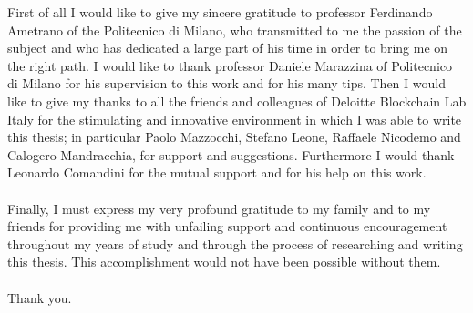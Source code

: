 \documentclass[
11pt, %
oneside, %
english, %
singlespacing, %
toctotoc, %
headsepline, %
]{MastersDoctoralThesis} %
\begin{document}
	\begin{acknowledgements}
		\addchaptertocentry{\acknowledgementname} %
		First of all I would like to give my sincere gratitude to professor Ferdinando Ametrano of the Politecnico di Milano, who transmitted to me the passion of the subject and who has dedicated a large part of his time in order to bring me on the right path. I would like to thank professor Daniele Marazzina of Politecnico di Milano for his supervision to this work and for his many tips. Then I would like to give my thanks to all the friends and colleagues of Deloitte Blockchain Lab Italy for the stimulating and innovative environment in which I was able to write this thesis; in particular Paolo Mazzocchi, Stefano Leone, Raffaele Nicodemo and Calogero Mandracchia, for support and suggestions. Furthermore I would thank Leonardo Comandini for the mutual support and for his help on this work.
		\\ \\
		Finally, I must express my very profound gratitude to my family and to my friends for providing me with unfailing support and continuous encouragement throughout my years of study and through the process of researching and writing this thesis. This accomplishment would not have been possible without them. 
		\\ \\
		Thank you.
	\end{acknowledgements}
	
	\hypersetup{%
		colorlinks = true,
		linkcolor  = black
	}
	\tableofcontents %
	
	
	
	
	
	
\end{document}
